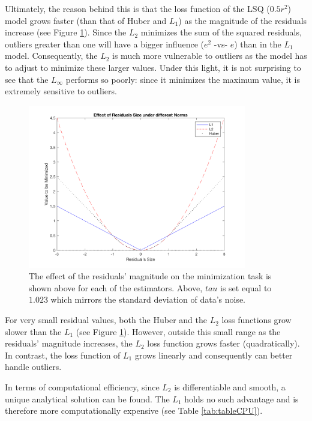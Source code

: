 Ultimately, the reason behind this is that the loss function of the LSQ ($0.5r^{2}$) model grows faster (than that of Huber and $L_1$) as the magnitude of the residuals increase (see Figure \ref{fig:ResMag}). Since the $L_2$ minimizes the sum of the squared residuals, outliers greater than one will have a bigger influence ($e^2$  -vs- $e$) than in the $L_1$ model. Consequently, the $L_2$ is much more vulnerable to outliers as the model has to adjust to minimize these larger values. Under this light, it is not surprising to see that the $L_\infty$ performs so poorly: since it minimizes the maximum value, it is extremely sensitive to outliers.  

 \begin{figure}[htb]
\centering
\includegraphics[width=0.85\textwidth]{../img/ResMag}
\caption{The effect of the residuals' magnitude on the minimization task is shown above for each of the estimators. Above, $tau$ is set equal to $1.023$ which mirrors the standard deviation of data's noise.}
\label{fig:ResMag}
\end{figure} 

For very small residual values, both the Huber and the $L_2$ loss functions grow slower than the $L_1$ (see Figure \ref{fig:ResMag}). However, outside this small range as the residuals' magnitude increases, the $L_2$ loss function grows faster (quadratically). In contrast, the loss function of $L_1$ grows linearly and consequently can better handle outliers. 

In terms of computational efficiency, since $L_2$ is differentiable and smooth, a unique analytical solution can be found. The $L_1$ holds no such advantage and is therefore more computationally expensive (see Table \ref{tab:tableCPU}).  

